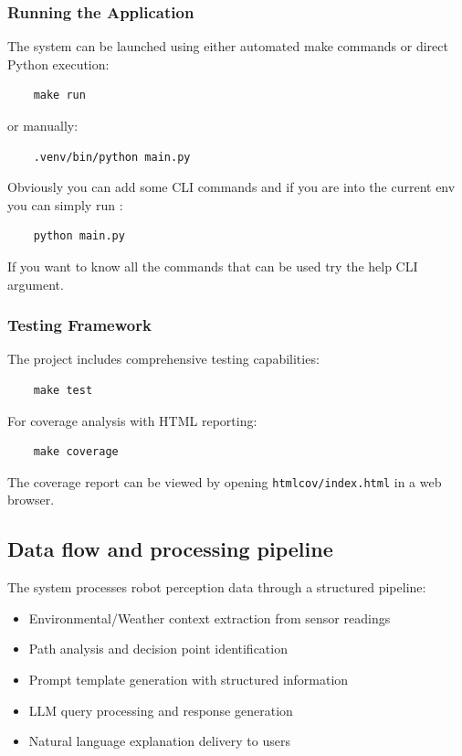 \subsubsection{Running the Application}

The system can be launched using either automated make commands or direct Python execution:

\begin{verbatim}
    make run
\end{verbatim}

or manually:

\begin{verbatim}
    .venv/bin/python main.py
\end{verbatim}

Obviously you can add some CLI commands and if you are into the current env you can simply run :

\begin{verbatim}
    python main.py
\end{verbatim}

If you want to know all the commands that can be used try the help CLI argument.

\subsubsection{Testing Framework}

The project includes comprehensive testing capabilities:

\begin{verbatim}
    make test
\end{verbatim}

For coverage analysis with HTML reporting:

\begin{verbatim}
    make coverage
\end{verbatim}

The coverage report can be viewed by opening \texttt{htmlcov/index.html} in a web browser.

\subsection{Data flow and processing pipeline}

The system processes robot perception data through a structured pipeline:
\begin{itemize}
    \item Environmental/Weather context extraction from sensor readings
    \item Path analysis and decision point identification
    \item Prompt template generation with structured information
    \item LLM query processing and response generation
    \item Natural language explanation delivery to users
\end{itemize}


